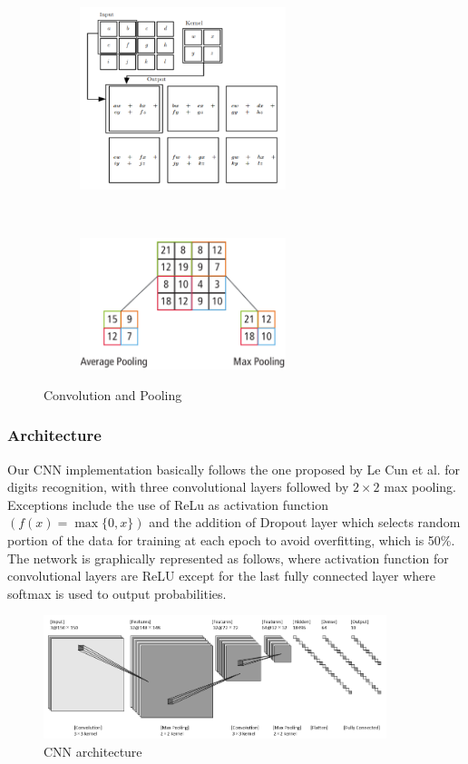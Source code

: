 \documentclass[11pt,titlepage,oneside,openany]{article}
\begin{document}
\begin{figure}[h]
	\centering
	\begin{subfigure}[b]{6cm}
		\includegraphics[width=6cm]{conv}
	\end{subfigure}
	~
	\begin{subfigure}[b]{6cm}
		\includegraphics[width=6cm]{pool}
	\end{subfigure}
	\caption{Convolution \cite{G16} and Pooling \cite{H15}}
	\label{fig:convpool}
\end{figure}

\subsubsection*{Architecture}

Our CNN implementation basically follows the one proposed by Le Cun et al. \cite{L90} for digits recognition, with three convolutional layers followed by $2\times2$ max pooling. Exceptions include the use of ReLu as activation function $(f(x) = \max \{0,x\})$ and the addition of Dropout layer which selects random portion of the data for training at each epoch to avoid overfitting, which is 50\%. The network is graphically represented as follows, where activation function for convolutional layers are ReLU except for the last fully connected layer where softmax is used to output probabilities.

\begin{figure}[h]
	\centering
	\includegraphics[width=10cm]{arch}
	\caption{CNN architecture}
	\label{fig:arch}
\end{figure}
\end{document}
